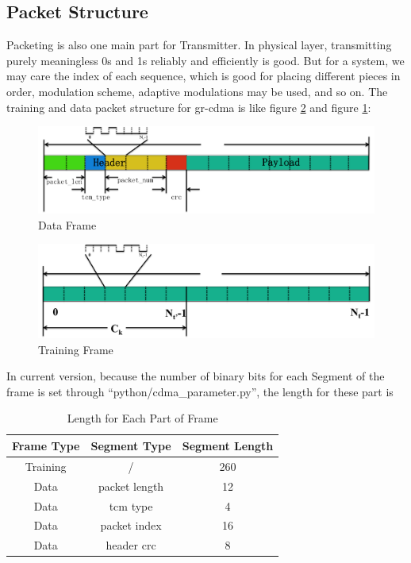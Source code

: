 \documentclass[a4paper]{report}
\begin{document}

\subsection{Packet Structure} %
\label{sub:packet_structure}

Packeting is also one main part for Transmitter. In physical layer, transmitting purely meaningless 0s and 1s reliably and efficiently is good. But for a system, we may care the index of each sequence, which is good for placing different pieces in order, modulation scheme, adaptive modulations may be used, and so on. The training and data packet structure for gr-cdma is like figure \ref{fig:training_frame} and figure \ref{fig:data_frame}:
\begin{figure}[ht]
	\centering
	\includegraphics[width = 5in]{figure/data_frame.png}
	\caption{Data Frame}
	\label{fig:data_frame}
\end{figure}
\begin{figure}[ht]
	\centering
	\includegraphics[width = 5in]{figure/training_frame.png}
	\caption{Training Frame}
	\label{fig:training_frame}
\end{figure}

In current version, because the number of binary bits for each Segment of the frame is set through ``python/cdma\_parameter.py'', the length for these part is 
\begin{table}[ht]
	\centering
	\caption{Length for Each Part of Frame}
	\label{tab:Length_for_each_part_of_frame}
	\begin{tabular}{c c c}
	\hline
		Frame Type 	& Segment Type 	& Segment Length\\ \hline
		Training 	& /		 		& 260			\\
		Data 		& packet length & 12 			\\
		Data 		& tcm type 		& 4 			\\
		Data 		& packet index 	& 16 			\\
		Data 		& header crc 	& 8 			\\ \hline
	\end{tabular}
\end{table}
\end{document}
